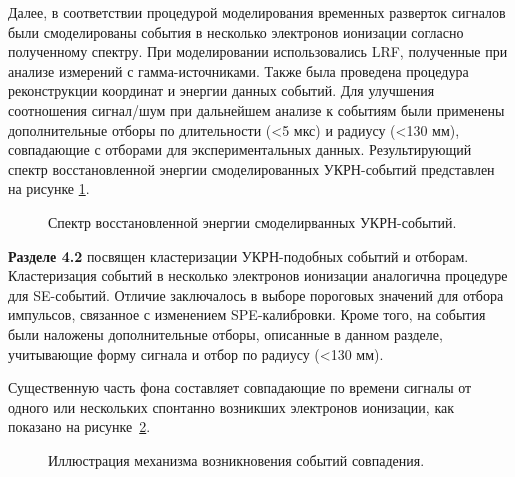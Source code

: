 Далее, в соответствии процедурой моделирования временных разверток сигналов были смоделированы события в несколько электронов ионизации согласно полученному спектру. При моделировании использовались LRF, полученные при анализе измерений с гамма-источниками. Также была проведена процедура реконструкции координат и энергии данных событий. Для улучшения соотношения сигнал/шум при дальнейшем анализе к событиям были применены дополнительные отборы по длительности (<5 мкс) и радиусу (<130 мм), совпадающие с отборами для экспериментальных данных. Результирующий спектр восстановленной энергии смоделированных УКРН-событий представлен на рисунке \ref{img:cevnscpectrumspe}. 
\begin{figure}[ht]
	\caption{Спектр восстановленной энергии смоделирванных УКРН-событий.}
	\label{img:cevnscpectrumspe}
\end{figure}

\textbf{Разделе 4.2} посвящен кластеризации УКРН-подобных событий и отборам. Кластеризация событий в несколько электронов ионизации аналогична процедуре для SE-событий. Отличие заключалось в выборе пороговых значений для отбора импульсов, связанное с изменением SPE-калибровки. Кроме того, на события были наложены дополнительные отборы, описанные в данном разделе, учитывающие форму сигнала и отбор по радиусу (<130 мм). 

Существенную часть фона составляет совпадающие по времени сигналы от одного или нескольких спонтанно возникших электронов ионизации, как показано на рисунке~\ref{img:overlap}.
\begin{figure}[h]
	\caption{Иллюстрация механизма возникновения событий совпадения.}
	\label{img:overlap}
\end{figure}

